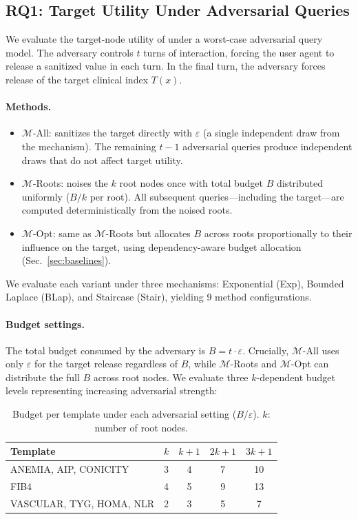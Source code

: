 \subsection{RQ1: Target Utility Under Adversarial Queries}
\label{sec:experiments-rq1}

We evaluate the target-node utility of \sysname{} under a worst-case adversarial query model. The adversary controls $t$ turns of interaction, forcing the user agent to release a sanitized value in each turn. In the final turn, the adversary forces release of the target clinical index $T(x)$.

\paragraph{\textbf{Methods.}}
\begin{itemize}
    \item $\mathcal{M}$-All: sanitizes the target directly with $\varepsilon$ (a single independent draw from the mechanism). The remaining $t-1$ adversarial queries produce independent draws that do not affect target utility.
    \item $\mathcal{M}$-Roots: noises the $k$ root nodes once with total budget $B$ distributed uniformly ($B/k$ per root). All subsequent queries---including the target---are computed deterministically from the noised roots.
    \item $\mathcal{M}$-Opt: same as $\mathcal{M}$-Roots but allocates $B$ across roots proportionally to their influence on the target, using dependency-aware budget allocation (Sec.~\ref{sec:baselines}).
\end{itemize}
We evaluate each variant under three mechanisms: Exponential (Exp), Bounded Laplace (BLap), and Staircase (Stair), yielding 9 method configurations.

\paragraph{\textbf{Budget settings.}}
The total budget consumed by the adversary is $B = t \cdot \varepsilon$. Crucially, $\mathcal{M}$-All uses only $\varepsilon$ for the target release regardless of $B$, while $\mathcal{M}$-Roots and $\mathcal{M}$-Opt can distribute the full $B$ across root nodes. We evaluate three $k$-dependent budget levels representing increasing adversarial strength:

\begin{table}[h]
\centering
\small
\caption{Budget per template under each adversarial setting ($B / \varepsilon$). $k$: number of root nodes.}
\label{tab:rq1_budget}
\begin{tabular}{lcccc}
\toprule
\textbf{Template} & $k$ & $k{+}1$ & $2k{+}1$ & $3k{+}1$ \\
\midrule
ANEMIA, AIP, CONICITY & 3 & 4 & 7 & 10 \\
FIB4 & 4 & 5 & 9 & 13 \\
VASCULAR, TYG, HOMA, NLR & 2 & 3 & 5 & 7 \\
\bottomrule
\end{tabular}
\end{table}

